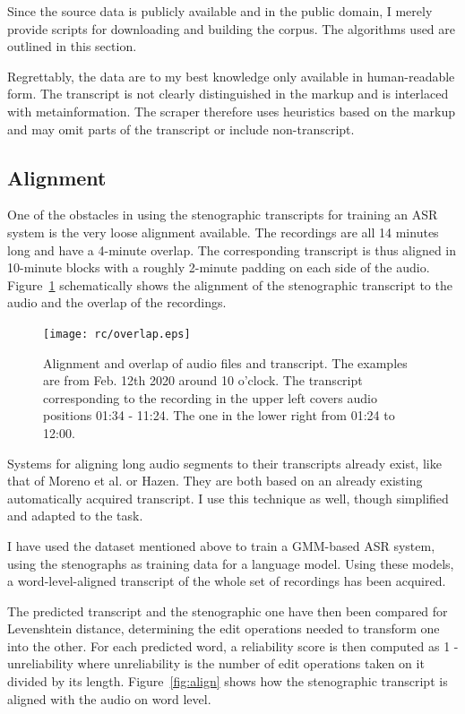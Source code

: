 \documentclass[hidelinks,12pt,a4paper]{report}
\begin{document}
Since the source data is publicly available and in the public domain, I merely
provide scripts for downloading and building the corpus. The algorithms
used are outlined in this section.

Regrettably, the data are to my best knowledge only available in human-readable
form. The transcript is not clearly distinguished in the markup and is
interlaced with metainformation. The scraper therefore uses heuristics based on
the markup and may omit parts of the transcript or include non-transcript.

\subsection{Alignment}

One of the obstacles in using the stenographic transcripts for training an ASR
system is the very loose alignment available. The recordings are all 14 minutes
long and have a 4-minute overlap. The corresponding transcript is thus aligned
in 10-minute blocks with a roughly 2-minute padding on each side of the audio.
Figure~\ref{fig:overlap} schematically shows the alignment of the stenographic
transcript to the audio and the overlap of the recordings.

\begin{figure}[tpb]
\centering
\texttt{[image: rc/overlap.eps]}
\caption{Alignment and overlap of audio files and transcript. The examples are
from Feb. 12th 2020 around 10 o'clock. The transcript corresponding to the
recording in the upper left covers audio positions 01:34 - 11:24. The one in the
lower right from 01:24 to 12:00.}
\label{fig:overlap}
\end{figure}

Systems for aligning long audio segments to their transcripts already exist,
like that of Moreno et al.\cite{moreno1998recursive} or
Hazen\cite{hazen2006automatic}. They are both based on an already existing
automatically acquired transcript. I use this technique as well, though 
simplified and adapted to the task.

I have used the dataset mentioned above\cite{pspdata} to train a GMM-based ASR
system, using the stenographs as training data for a language model. Using these
models, a word-level-aligned transcript of the whole set of recordings has been
acquired.

The predicted transcript and the stenographic one have then been compared for
Levenshtein distance, determining the edit operations needed to transform one
into the other. For each predicted word, a reliability score is then
computed as 1 - unreliability where unreliability is the number of edit
operations taken on it divided by its length.
Figure~\ref{fig:align} shows how the stenographic transcript is aligned with the
audio on word level.
\end{document}
